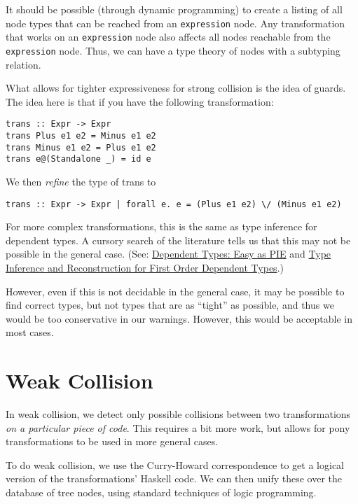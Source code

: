 \documentclass[11pt]{article}
\begin{document}
It should be possible (through dynamic programming) to create a listing of all node types that can be reached from an \verb~expression~ node. Any transformation that works on an \verb~expression~ node also affects all nodes reachable from the \verb~expression~ node. Thus, we can have a type theory of nodes with a subtyping relation.

What allows for tighter expressiveness for strong collision is the idea of guards. The idea here is that if you have the following transformation:

\begin{lstlisting}
trans :: Expr -> Expr
trans Plus e1 e2 = Minus e1 e2
trans Minus e1 e2 = Plus e1 e2
trans e@(Standalone _) = id e
\end{lstlisting}

We then \emph{refine} the type of trans to 

\begin{lstlisting}
trans :: Expr -> Expr | forall e. e = (Plus e1 e2) \/ (Minus e1 e2)
\end{lstlisting} 

For more complex transformations, this is the same as type inference for dependent types. A cursory search of the literature tells us that this may not be possible in the general case. (See: \href{http://research.microsoft.com/en-us/people/dimitris/pie.pdf}{Dependent Types: Easy as PIE} and \href{http://www.google.com/url?sa=t&rct=j&q=&esrc=s&source=web&cd=3&cad=rja&ved=0CDsQFjAC&url=http%3A%2F%2Fciteseerx.ist.psu.edu%2Fviewdoc%2Fdownload%3Fdoi%3D10.1.1.30.8049%26rep%3Drep1%26type%3Dpdf&ei=kOdXUIKzD8jp0QHzmoCwBg&usg=AFQjCNHhbxCQcN_3CiBI3SMJyzZpzvDrkw}{Type Inference and Reconstruction for First Order Dependent Types}.)

However, even if this is not decidable in the general case, it may be possible to find correct types, but not types that are as ``tight'' as possible, and thus we would be too conservative in our warnings. However, this would be acceptable in most cases.
\section{Weak Collision}
\label{sec-3}


In weak collision, we detect only possible collisions between two transformations \emph{on a particular piece of code}. This requires a bit more work, but allows for pony transformations to be used in more general cases.

To do weak collision, we use the Curry-Howard correspondence to get a logical version of the transformations' Haskell code. We can then unify these over the database of tree nodes, using standard techniques of logic programming. 
\end{document}
